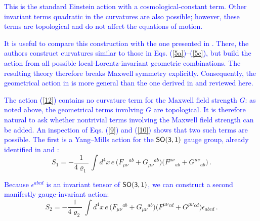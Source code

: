 \documentclass [prd,reprint,eqsecnum,nofootinbib]  {revtex4-1}
\newcommand{\corr}[1]{\textcolor{blue}{#1}}
\begin{document}
\corr{This is the standard Einstein action with a cosmological-constant
term. Other invariant terms quadratic in the curvatures are also
possible; however, these terms are topological and do not affect the
equations of motion.}

\corr{It is useful to compare this construction with the one presented
in \cite{deAzcarraga:2010sw}. There, the authors construct curvatures
similar to those in Eqs. (\ref{5a})--(\ref{5c}), but build the action
from all possible local-Lorentz-invariant geometric combinations.
The resulting theory therefore breaks Maxwell symmetry explicitly.
Consequently, the geometrical action in \cite{deAzcarraga:2010sw} is
more general than the one derived in \cite{Durka:2011nf} and reviewed
here.}

\corr{The action (\ref{12}) contains no curvature term for the Maxwell
field strength $G$: as noted above, the geometrical terms involving
$G$ are topological. It is therefore natural to ask whether
nontrivial terms involving the Maxwell field strength can be added.
An inspection of Eqs. (\ref{9}) and (\ref{10}) shows that two such
terms are possible. The first is a Yang--Mills action for the
$\sf{SO(3,1)}$ gauge group, already identified in
\cite{Soroka:2011tc} and \cite{Durka:2011nf}:}
\begin{equation}\label{13}

 S_{1}= -  \frac1{4\varrho_1}\,\int d^4x\, e\, \big( F_{\mu\nu}{}^{ab} + G_{\mu\nu}{}^{ab}\big) \big( F^{\mu\nu}{}_{ab} +

    G^{\mu\nu}{}_{ab}\big)\, .

\end{equation}

\corr{Because $\epsilon^{abcd}$ is an invariant tensor of
$\sf{SO(3,1)}$, we can construct a second manifestly gauge-invariant
action:}
\begin{equation}\label{13a}

 S_{2}= -  \frac1{4\varrho_2}\,\int d^4x\, e\, \big( F_{\mu\nu}{}^{ab} + G_{\mu\nu}{}^{ab}\big) \big( F^{\mu\nu}{}^{cd} +

    G^{\mu\nu}{}^{cd}\big) \epsilon_{abcd}\, .

\end{equation}
\end{document}
